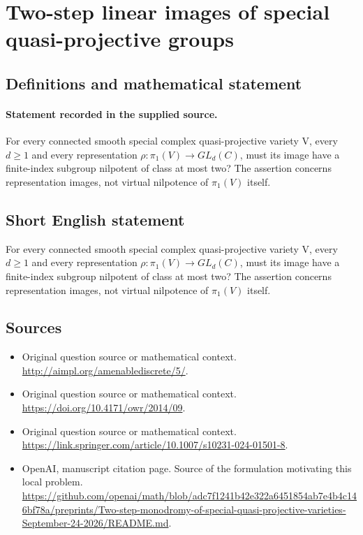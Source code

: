 \documentclass[11pt]{article}
\begin{document}
\section*{Two-step linear images of special quasi-projective groups}\label{statement}
\subsection{Definitions and mathematical statement}
\paragraph{Statement recorded in the supplied source.}
For every connected smooth special complex quasi-projective variety V, every $d\geq 1$ and every representation $\rho :\pi _{1}(V)\to GL_d(C)$, must its image have a finite-index subgroup nilpotent of class at most two? The assertion concerns representation images, not virtual nilpotence of $\pi _{1}(V)$ itself.
\subsection{Short English statement}
For every connected smooth special complex quasi-projective variety V, every $d\geq 1$ and every representation $\rho :\pi _{1}(V)\to GL_d(C)$, must its image have a finite-index subgroup nilpotent of class at most two? The assertion concerns representation images, not virtual nilpotence of $\pi _{1}(V)$ itself.
\subsection{Sources}
\begin{itemize}
\item[S1] Original question source or mathematical context.
\url{http://aimpl.org/amenablediscrete/5/}.
\item[S2] Original question source or mathematical context.
\url{https://doi.org/10.4171/owr/2014/09}.
\item[S3] Original question source or mathematical context.
\url{https://link.springer.com/article/10.1007/s10231-024-01501-8}.
\item[S4] OpenAI, manuscript citation page. Source of the formulation motivating this local problem.
\url{https://github.com/openai/math/blob/adc7f1241b42e322a6451854ab7e4b4c146bf78a/preprints/Two-step-monodromy-of-special-quasi-projective-varieties-September-24-2026/README.md}.
\end{itemize}
\end{document}
